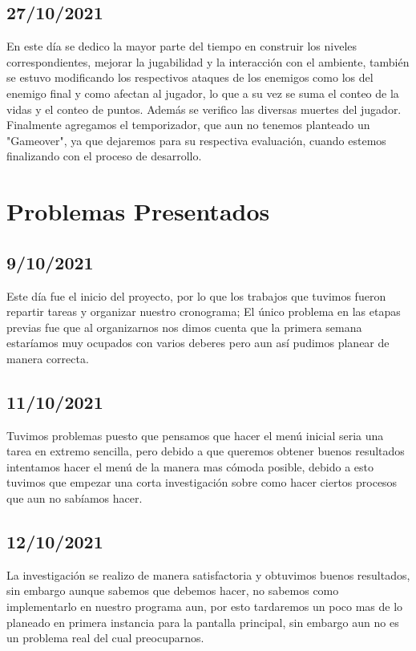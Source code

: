 \documentclass{article}
\begin{document}
    \subsection{27/10/2021}
    En este día se dedico la mayor parte del tiempo en construir los niveles correspondientes, mejorar la jugabilidad y la interacción con el ambiente, también se estuvo modificando los respectivos ataques de los enemigos como los del enemigo final \cite{video_circular} y como afectan al jugador, lo que a su vez se suma el conteo de la vidas y el conteo de puntos. Además se verifico las diversas muertes del jugador. Finalmente agregamos el temporizador, que aun no tenemos planteado un "Gameover", ya que dejaremos para su respectiva evaluación, cuando estemos finalizando con el proceso de desarrollo.  
    
\section{Problemas Presentados}
    \subsection{9/10/2021}
    Este día fue el inicio del proyecto, por lo que los trabajos que tuvimos fueron repartir tareas y organizar nuestro cronograma; El único problema en las etapas previas fue que al organizarnos nos dimos cuenta que la primera semana estaríamos muy ocupados con varios deberes pero aun así pudimos planear de manera correcta.

    \subsection{11/10/2021}
    Tuvimos problemas puesto que pensamos que hacer el menú inicial seria una tarea en extremo sencilla, pero debido a que queremos obtener buenos resultados intentamos hacer el menú de la manera mas cómoda posible, debido a esto tuvimos que empezar una corta investigación sobre como hacer ciertos procesos que aun no sabíamos hacer.
    
    \subsection{12/10/2021}
    La investigación se realizo de manera satisfactoria y obtuvimos buenos resultados, sin embargo aunque sabemos que debemos hacer, no sabemos como implementarlo en nuestro programa aun, por esto tardaremos un poco mas de lo planeado en primera instancia para la pantalla principal, sin embargo aun no es un problema real del cual preocuparnos.
    
\end{document}
